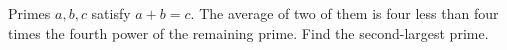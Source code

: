 Primes $a,b,c$ satisfy $a+b=c$. The average of two of them is four less than four times the fourth power of the remaining prime. Find the second-largest prime.
